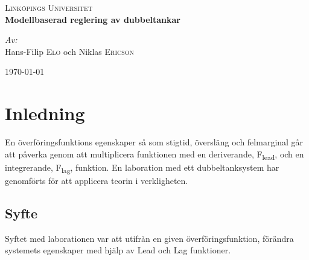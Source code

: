 \documentclass{article}
\begin{document}
\begin{titlepage}
\begin{center}


\textsc{\LARGE Link{\"o}pings Universitet}\\[1.5cm]


{ \huge \bfseries Modellbaserad reglering av dubbeltankar \\[0.4cm] }

\large
\emph{Av:}\\
Hans-Filip \textsc{Elo} och Niklas \textsc{Ericson}

\vfill

{\large \today}

\end{center}


\newpage
\thispagestyle{empty}
\tableofcontents
\listoffigures
\listoftables

\end{titlepage}
\pagestyle{fancy}

\fancyhead{} %
\fancyhead[R]{\today \slshape}

\fancyfoot{} %
\fancyfoot[L,R]{\thepage}



\section{Inledning}
En överföringsfunktions egenskaper så som stigtid, översläng och felmarginal går att påverka genom att multiplicera funktionen med en deriverande, F\textsubscript{lead}, och en integrerande, F\textsubscript{lag}, funktion. En laboration med ett dubbeltanksystem har genomförts för att applicera teorin i verkligheten.

\subsection{Syfte}
Syftet med laborationen var att utifrån en given överföringsfunktion, förändra systemets egenskaper med hjälp av Lead och Lag funktioner.
\end{document}
